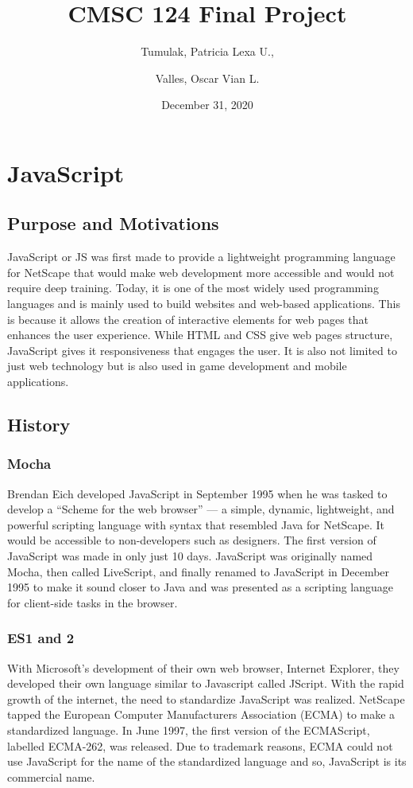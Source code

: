 \documentclass{article}
\title{CMSC 124 Final Project}
\date{December 31, 2020}
\author{Tumulak, Patricia Lexa U., \\\and{} Valles, Oscar Vian L.}
\begin{document}
\maketitle
\newpage
\tableofcontents
\newpage
{}

\section{JavaScript}
\subsection{Purpose and Motivations}
JavaScript or JS was first made to provide a lightweight programming language
for NetScape that would make web development more accessible and would not
require deep training. Today, it is one of the most widely used programming
languages and is mainly used to build websites and web-based applications. This
is because it allows the creation of interactive elements for web pages that
enhances the user experience. While HTML and CSS give web pages structure,
JavaScript gives it responsiveness that engages the user. It is also not limited
to just web technology but is also used in game development and mobile
applications.

\subsection{History}

    \subsubsection{Mocha}
    Brendan Eich developed JavaScript in September 1995 when he was tasked to
    develop a “Scheme for the web browser” --- a simple, dynamic, lightweight,
    and powerful scripting language with syntax that resembled Java for
    NetScape. It would be accessible to non-developers such as designers. The
    first version of JavaScript was made in only just 10 days. JavaScript was
    originally named Mocha, then called LiveScript, and finally renamed to
    JavaScript in December 1995 to make it sound closer to Java and was
    presented as a scripting language for client-side tasks in the browser.

    \subsubsection{ES1 and 2}
    With Microsoft’s development of their own web browser, Internet Explorer,
    they developed their own language similar to Javascript called JScript. With
    the rapid growth of the internet, the need to standardize JavaScript was
    realized. NetScape tapped the European Computer Manufacturers Association
    (ECMA) to make a standardized language. In June 1997, the first version of
    the ECMAScript, labelled ECMA-262, was released. Due to trademark reasons,
    ECMA could not use JavaScript for the name of the standardized language and
    so, JavaScript is its commercial name.
\end{document}
